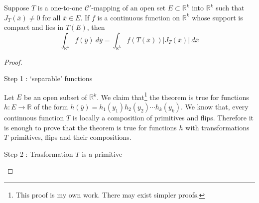 \begin{theorem}
	Suppose $T$ is a one-to-one $\mathscr{C}'$-mapping of an open set $E \subset \mathbb{R}^k$ into $\mathbb{R}^k$ such that $J_T(\bar{x}) \ne 0$ for all $\bar{x} \in E$.
	If $f$ is a continuous function on $\mathbb{R}^k$ whose support is compact and lies in $T(E)$, then
	\begin{equation}
		\int_{\mathbb{R}^k} f(\bar{y})\ d\bar{y} = \int_{\mathbb{R}^k} f(T(\bar{x}))|J_T(\bar{x})|\ d\bar{x}
	\end{equation}
\end{theorem}
\begin{proof}
	\begin{commentary}
		Step 1 : `separable' functions
	\end{commentary}

	Let $E$ be an open subset of $\mathbb{R}^k$.
	We claim that\footnote{This proof is my own work. There may exist simpler proofs.}
	the theorem is true for functions $h : E \to \mathbb{R}$ of the form $h(\bar{y}) = h_1(y_1)h_2(y_2) \dotsm h_k(y_k)$.
	We know that, every continuous function $T$ is locally a composition of primitives and flips.
	Therefore it is enough to prove that the theorem is true for functions $h$ with transformations $T$ primitives, flips and their compositions.\\
	\begin{commentary}
		Step 2 : Trasformation $T$ is a primitive
	\end{commentary}


\end{proof}
